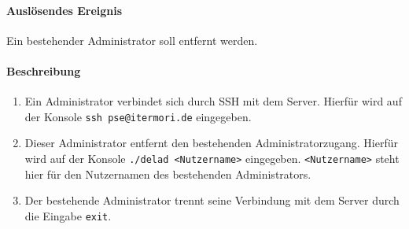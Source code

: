 \paragraph{Auslösendes Ereignis}
Ein bestehender \Gls{Administrator} soll entfernt werden.
\paragraph{Beschreibung}
\begin{enumerate}
    \item   Ein \Gls{Administrator} verbindet sich durch \Gls{SSH} mit dem Server.
            Hierfür wird auf der Konsole \texttt{ssh pse@itermori.de} eingegeben.
    \item   Dieser \Gls{Administrator} entfernt den bestehenden \Gls{Administrator}zugang.
            Hierfür wird auf der Konsole \texttt{./delad <Nutzername>} eingegeben.
            \texttt{<Nutzername>} steht hier für den Nutzernamen des bestehenden \Gls{Administrator}s.
    \item   Der bestehende Administrator trennt seine Verbindung mit dem \Gls{Server} durch die Eingabe \texttt{exit}.
\end{enumerate}

